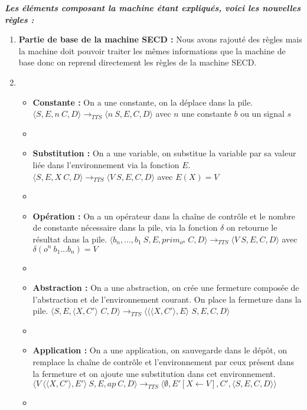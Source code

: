 \documentclass[10pt,a4paper]{article}
\begin{document}
					
					
					
				\textbf{\textit{Les éléments composant la machine étant expliqués, voici les nouvelles règles :}}
				\smallbreak
				\begin{enumerate}
					\item[] \textbf{Partie de base de la machine SECD :} Nous avons rajouté des règles mais la machine doit pouvoir traiter les mêmes informations que la machine de base donc on reprend directement les règles de la machine SECD. 
					\item[]
					\begin{itemize}
						\item[] \textbf{Constante :} On a une constante, on la déplace dans la pile.
						\smallbreak
						$\langle S,E,n~C,D\rangle 
						\longrightarrow_{TTS} 
						\langle n~S,E,C,D\rangle$ avec $n$ une constante $b$ ou un signal $s$
						\item[]
							
						\item[] \textbf{Substitution :} On a une variable, on substitue la variable par sa valeur liée dans l'environnement via la fonction $E$.
						\smallbreak
						$\langle S,E,X~C,D\rangle
						\longrightarrow_{TTS} 
						\langle V~S,E,C,D\rangle$ avec $E(X) = V$
						\item[]
							
						\item[] \textbf{Opération :} On a un opérateur dans la chaîne de contrôle et le nombre de constante nécessaire dans la pile, via la fonction $\delta$ on retourne le résultat dans la pile.
						\smallbreak
						$\langle b_{n},...,b_{1}~S,E,prim_{o^{n}}~C,D\rangle
						\longrightarrow_{TTS} 
						\langle V~S,E,C,D\rangle$ avec $\delta(o^{n}~b_{1}...b_{n}) = V$
						\item[]
							
						\item[]  \textbf{Abstraction :} On a une abstraction, on crée une fermeture composée de l'abstraction et de l'environnement courant. On place la fermeture dans la pile.
						\smallbreak
						$\langle S,E,\langle X,C'\rangle$ $C,D\rangle
						\longrightarrow_{TTS} 
						\langle \langle\langle X,C'\rangle,E\rangle$ $S,E,C,D\rangle$
						\item[]
							
						\item[]  \textbf{Application :} On a une application, on sauvegarde dans le dépôt, on remplace la chaîne de contrôle et l'environnement par ceux présent dans la fermeture et on ajoute une substitution dans cet environnement.
						\smallbreak
						$\langle V~\langle\langle X,C'\rangle,E'\rangle~S,E,ap~C,D\rangle
						\longrightarrow_{TTS} 
						\langle \emptyset,E'[X \leftarrow V],C',\langle S,E,C,D\rangle\rangle$
						\item[] 
							

\end{itemize}
\end{enumerate}
\end{document}
